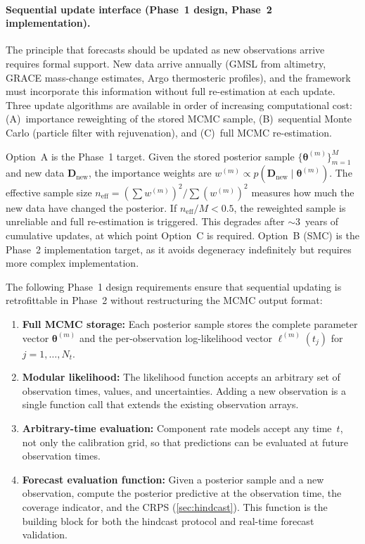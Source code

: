 \documentclass[11pt]{article}
\begin{document}
\paragraph{Sequential update interface (Phase~1 design, Phase~2 implementation).}
The principle that forecasts should be updated as new observations arrive requires formal support.  New data arrive annually (GMSL from altimetry, GRACE mass-change estimates, Argo thermosteric profiles), and the framework must incorporate this information without full re-estimation at each update.  Three update algorithms are available in order of increasing computational cost: (A)~importance reweighting of the stored MCMC sample, (B)~sequential Monte Carlo (particle filter with rejuvenation), and (C)~full MCMC re-estimation.

Option~A is the Phase~1 target.  Given the stored posterior sample $\{\boldsymbol{\theta}^{(m)}\}_{m=1}^M$ and new data $\mathbf{D}_{\text{new}}$, the importance weights are $w^{(m)} \propto p(\mathbf{D}_{\text{new}} \mid \boldsymbol{\theta}^{(m)})$.  The effective sample size $n_{\text{eff}} = (\sum w^{(m)})^2 / \sum (w^{(m)})^2$ measures how much the new data have changed the posterior.  If $n_{\text{eff}} / M < 0.5$, the reweighted sample is unreliable and full re-estimation is triggered.  This degrades after $\sim$3~years of cumulative updates, at which point Option~C is required.  Option~B (SMC) is the Phase~2 implementation target, as it avoids degeneracy indefinitely but requires more complex implementation.

The following Phase~1 design requirements ensure that sequential updating is retrofittable in Phase~2 without restructuring the MCMC output format:
\begin{enumerate}
  \item \textbf{Full MCMC storage:} Each posterior sample stores the complete parameter vector $\boldsymbol{\theta}^{(m)}$ and the per-observation log-likelihood vector $\ell^{(m)}(t_j)$ for $j = 1, \ldots, N_t$.
  \item \textbf{Modular likelihood:} The likelihood function accepts an arbitrary set of observation times, values, and uncertainties.  Adding a new observation is a single function call that extends the existing observation arrays.
  \item \textbf{Arbitrary-time evaluation:} Component rate models accept any time~$t$, not only the calibration grid, so that predictions can be evaluated at future observation times.
  \item \textbf{Forecast evaluation function:} Given a posterior sample and a new observation, compute the posterior predictive at the observation time, the coverage indicator, and the CRPS (\cref{sec:hindcast}).  This function is the building block for both the hindcast protocol and real-time forecast validation.
\end{enumerate}
\end{document}
